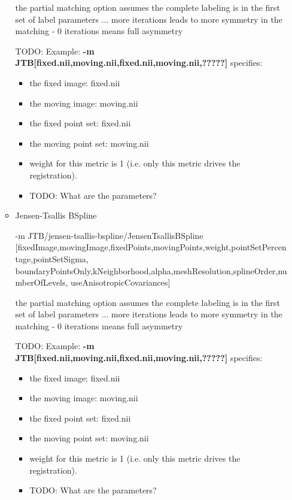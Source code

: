 \begin{itemize}
\begin{itemize}
        the partial matching option assumes the complete labeling is in the first set of label parameters ... more iterations leads to more symmetry in the matching  - 0 iterations means full asymmetry 

        TODO: Example: \textbf{-m JTB[fixed.nii,moving.nii,fixed.nii,moving.nii,?????]} specifies:
            \begin{itemize}
             \item the fixed image: fixed.nii
             \item the moving image: moving.nii             
             \item the fixed point set: fixed.nii
             \item the moving point set: moving.nii
             \item weight for this metric is 1 (i.e. only this metric drives the registration).
             \item TODO: What are the parameters?
            \end{itemize}


        \item Jensen-Tsallis BSpline

        -m JTB/jensen-tsallis-bspline/JensenTsallisBSpline [fixedImage,movingImage,fixedPoints,movingPoints,weight,pointSetPercentage,pointSetSigma, boundaryPointsOnly,kNeighborhood,alpha,meshResolution,splineOrder,numberOfLevels, useAnisotropicCovariances]

        the partial matching option assumes the complete labeling is in the first set of label parameters ... more iterations leads to more symmetry in the matching  - 0 iterations means full asymmetry 

            TODO: Example: \textbf{-m JTB[fixed.nii,moving.nii,fixed.nii,moving.nii,?????]} specifies:
            \begin{itemize}
             \item the fixed image: fixed.nii
             \item the moving image: moving.nii             
             \item the fixed point set: fixed.nii
             \item the moving point set: moving.nii
             \item weight for this metric is 1 (i.e. only this metric drives the registration).
             \item TODO: What are the parameters?
            \end{itemize}


\end{itemize}
\end{itemize}
